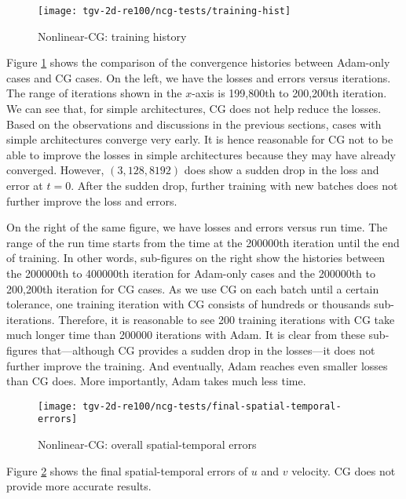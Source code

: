 \begin{figure}[hbt!]
    \centering%
    \texttt{[image: tgv-2d-re100/ncg-tests/training-hist]}%
    \caption[%
        Nonlinear-CG: training history%
    ]{%
        Nonlinear-CG: training history%
    }\label{fig:ncg-tests-train-hist}%
\end{figure}

Figure \ref{fig:ncg-tests-train-hist} shows the comparison of the convergence histories between Adam-only cases and CG cases.
On the left, we have the losses and errors versus iterations.
The range of iterations shown in the $x$-axis is 199,800th to 200,200th iteration.
We can see that, for simple architectures, CG does not help reduce the losses.
Based on the observations and discussions in the previous sections, cases with simple architectures converge very early.
It is hence reasonable for CG not to be able to improve the losses in simple architectures because they may have already converged.
However, $(3, 128, 8192)$ does show a sudden drop in the loss and error at $t=0$.
After the sudden drop, further training with new batches does not further improve the loss and errors.

On the right of the same figure, we have losses and errors versus run time.
The range of the run time starts from the time at the \num{200000}th iteration until the end of training.
In other words, sub-figures on the right show the histories between the \num{200000}th to \num{400000}th iteration for Adam-only cases and the \num{200000}th to 200,200th iteration for CG cases.
As we use CG on each batch until a certain tolerance, one training iteration with CG consists of hundreds or thousands sub-iterations.
Therefore, it is reasonable to see 200 training iterations with CG take much longer time than \num{200000} iterations with Adam.
It is clear from these sub-figures that---although CG provides a sudden drop in the losses---it does not further improve the training.
And eventually, Adam reaches even smaller losses than CG does.
More importantly, Adam takes much less time.

\begin{figure}[hbt!]
    \centering%
    \texttt{[image: tgv-2d-re100/ncg-tests/final-spatial-temporal-errors]}%
    \caption[%
        Nonlinear-CG: overall spatial-temporal errors%
    ]{%
        Nonlinear-CG: overall spatial-temporal errors%
    }\label{fig:ncg-tests-final-sterrs}%
\end{figure}

Figure \ref{fig:ncg-tests-final-sterrs} shows the final spatial-temporal errors of $u$ and $v$ velocity.
CG does not provide more accurate results.

